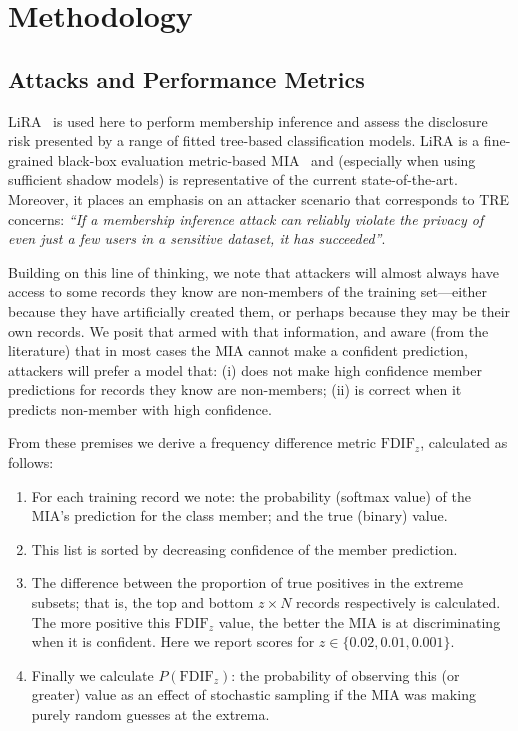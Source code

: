 \section{Methodology}%
\label{sec:methodology}

\subsection{Attacks and Performance Metrics}

LiRA~\cite{Carlini:2022} is used here to perform membership inference and assess the disclosure risk presented by a range of fitted tree-based classification models. LiRA is a fine-grained black-box evaluation metric-based MIA~\cite{Niu:2023} and (especially when using sufficient shadow models) is representative of the current state-of-the-art. Moreover, it places an emphasis on an attacker scenario that corresponds to TRE concerns: \textit{``If a membership inference attack can reliably violate the privacy of even just a few users in a sensitive dataset, it has succeeded''}.

Building on this line of thinking, we note that attackers will almost always have access to some records they know are non-members of the training set---either because they have artificially created them, or perhaps because they may be their own records. We posit that armed with that information, and aware (from the literature) that in most cases the MIA cannot make a confident prediction, attackers will prefer a model that: (i) does not make high confidence member predictions for records they know are non-members; (ii) is correct when it predicts non-member with high confidence. 

From these premises we derive a frequency difference metric $\text{FDIF}_z$, calculated as follows:
    \begin{enumerate}
        \item For each training record we note: the probability (softmax value) of the MIA's prediction for the class member; and the true (binary) value.
        \item This list is sorted by decreasing confidence of the member prediction.
        \item The difference between the proportion of true positives in the extreme subsets; that is, the top and bottom $z \times N$ records respectively is calculated. The more positive this $\text{FDIF}_z$ value, the better the MIA is at discriminating when it is confident. Here we report scores for $z \in \{0.02,0.01,0.001\}$.
        \item Finally we calculate $P(\text{FDIF}_z)$: the probability of observing this (or greater) value as an effect of stochastic sampling if the MIA was making purely random guesses at the extrema.
    \end{enumerate}

